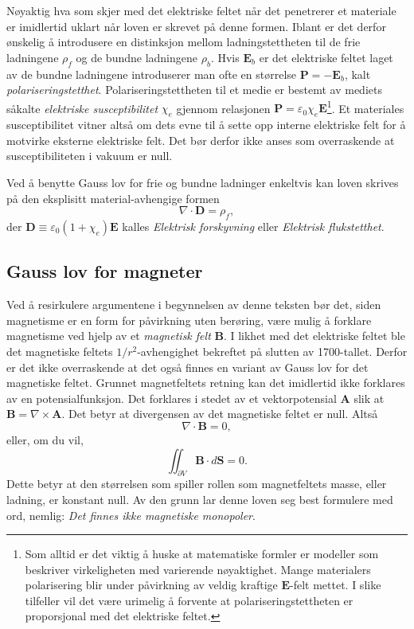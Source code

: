 \documentclass[twoside,utf8]{article}
\begin{document}
  Nøyaktig hva som skjer med det elektriske feltet når det penetrerer et materiale er imidlertid uklart når loven er skrevet på denne formen. Iblant er det derfor ønskelig å introdusere en distinksjon mellom ladningstettheten til de frie ladningene $\rho_{f}$ og de bundne ladningene $\rho_b$. Hvis $\mathbf{E}_b$ er det elektriske feltet laget av de bundne ladningene introduserer man ofte en størrelse $\mathbf{P}=-\mathbf{E}_b$, kalt {\it polariseringstetthet}. Polariseringstettheten til et medie er bestemt av mediets såkalte {\it elektriske susceptibilitet} $\chi_e$ gjennom relasjonen $\mathbf{P}=\varepsilon_0 \chi_e \mathbf{E}$\footnote{Som alltid er det viktig å huske at matematiske formler er modeller som beskriver virkeligheten med varierende nøyaktighet. Mange materialers polarisering blir under påvirkning av veldig kraftige $\mathbf{E}$-felt mettet. I slike tilfeller vil det være urimelig å forvente at polariseringstettheten er proporsjonal med det elektriske feltet.}. Et materiales susceptibilitet vitner altså om dets evne til å sette opp interne elektriske felt for å motvirke eksterne elektriske felt. Det bør derfor ikke anses som overraskende at susceptibiliteten i vakuum er null.

  Ved å benytte Gauss lov for frie og bundne ladninger enkeltvis kan loven skrives på den eksplisitt material-avhengige formen
  \[
    \nabla \cdot \mathbf{D} = \rho_f,
  \]
  der $\mathbf{D}\equiv \varepsilon_0 (1+\chi_e)\mathbf{E}$ kalles {\it Elektrisk forskyvning} eller {\it Elektrisk flukstetthet}.





\subsection{Gauss lov for magneter}
Ved å resirkulere argumentene i begynnelsen av denne teksten bør det, siden magnetisme er en form for påvirkning uten berøring, være mulig å forklare magnetisme ved hjelp av et {\it magnetisk felt} $\mathbf{B}$. I likhet med det elektriske feltet ble det magnetiske feltets $1/r^2$-avhengighet bekreftet på slutten av 1700-tallet. Derfor er det ikke overraskende at det også finnes en variant av Gauss lov for det magnetiske feltet. Grunnet magnetfeltets retning kan det imidlertid ikke forklares av en potensialfunksjon. Det forklares i stedet av et vektorpotensial $\mathbf{A}$ slik at $\mathbf{B}=\nabla \times \mathbf{A}$. Det betyr at divergensen av det magnetiske feltet er null. Altså
$$
\nabla \cdot \mathbf{B} = 0,
$$
eller, om du vil,
$$
\iint_{\partial V} \mathbf{B} \cdot d\mathbf{S} = 0.
$$
Dette betyr at den størrelsen som spiller rollen som magnetfeltets masse, eller ladning, er konstant null. Av den grunn lar denne loven seg best formulere med ord, nemlig: {\it Det finnes ikke magnetiske monopoler}.
\end{document}

